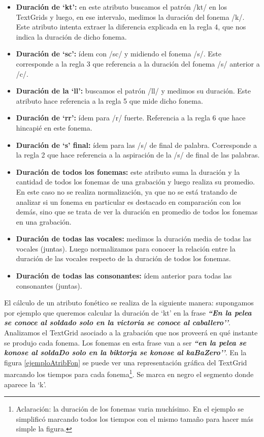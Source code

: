 \begin{itemize}
    \item \textbf{Duración de `kt’:} en este atributo buscamos el patrón /kt/ en los TextGrids y luego, en ese intervalo, medimos la duración del fonema /k/. Este atributo intenta extraer la diferencia explicada en la regla 4, que nos indica la duración de dicho fonema.
    \item \textbf{Duración de `sc’:} ídem con /sc/ y midiendo el fonema /s/. Este corresponde a la regla 3 que referencia a la duración del fonema /s/ anterior a /c/.  
    \item \textbf{Duración de la `ll’:} buscamos el patrón /ll/ y medimos su duración. Este atributo hace referencia a la regla 5 que mide dicho fonema.
    \item \textbf{Duración de `rr’:} ídem para /r/ fuerte. Referencia a la regla 6 que hace hincapié en este fonema.
    \item \textbf{Duración de `s’ final:} ídem para las /s/ de final de palabra. Corresponde a la regla 2 que hace referencia a la aspiración de la /s/ de final de las palabras.  
    \item \textbf{Duración de todos los fonemas:} este atributo suma la duración y la cantidad de todos los fonemas de una grabación y luego realiza su promedio. En este caso no se realiza normalización, ya que no se está tratando de analizar si un fonema en particular es destacado en comparación con los demás, sino que se trata de ver la duración en promedio de todos los fonemas en una grabación.
    \item \textbf{Duración de todas las vocales:} medimos la duración media de todas las vocales (juntas). Luego normalizamos para conocer la relación entre la duración de las vocales respecto de la duración de todos los fonemas.
    \item \textbf{Duración de todas las consonantes:} ídem anterior para todas las consonantes (juntas). 
\end{itemize}

El cálculo de un atributo fonético se realiza de la siguiente manera: supongamos por ejemplo que queremos calcular la duración de `kt’ en la frase \textbf{\textit{``En la pelea se conoce al soldado solo en la victoria se conoce al caballero’’}}. Analizamos el TextGrid asociado a la grabación que nos proveerá en qué instante se produjo cada fonema. Los fonemas en esta frase van a ser \textbf{\textit{``en la pelea se konose al soldaDo solo en la biktorja se konose al kaBaZero’’}}. En la figura \ref{ejemploAtribFon} se puede ver una representación gráfica del TextGrid marcando los tiempos para cada fonema\footnote{Aclaración: la duración de los fonemas varia muchísimo. En el ejemplo se simplificó marcando todos los tiempos con el mismo tamaño para hacer más simple la figura.}. Se marca en negro el segmento donde aparece la `k’.


